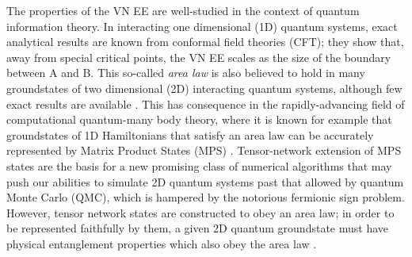 \documentclass[prl,aps,twocolumn,floatfix,amsmath,amssymb,superscriptaddress,tightenlines]{revtex4}
\begin{document}
The properties of the VN EE are well-studied in the context of quantum information theory.
In interacting one dimensional (1D) quantum systems, exact analytical results are known from conformal
field theories (CFT); they show that, away from special critical points,
the VN EE scales as the size of the boundary between A and B.
This so-called {\it area law} \cite{Shredder} is also believed to hold in many
groundstates of two dimensional (2D) interacting quantum systems,
although few exact results are available \cite{ALreview}.  This has 
consequence in the
rapidly-advancing field of computational quantum-many body theory, where
it is known for example that groundstates of 1D Hamiltonians that satisfy an area law
can be accurately represented by Matrix Product States (MPS) \cite{MPS_DMRG}.
Tensor-network extension of MPS states are the basis
for a new promising class of numerical algorithms \cite{PEPS1,PEPS2} that may push our
abilities to simulate 2D quantum systems past that
allowed by quantum Monte Carlo (QMC), which is hampered by
the notorious fermionic sign problem.  However, tensor network states
are constructed to obey an area law; in order to be represented faithfully
by them, a given 2D quantum groundstate must have physical entanglement
properties which also obey the area law \cite{ALreview}.


\end{document}
